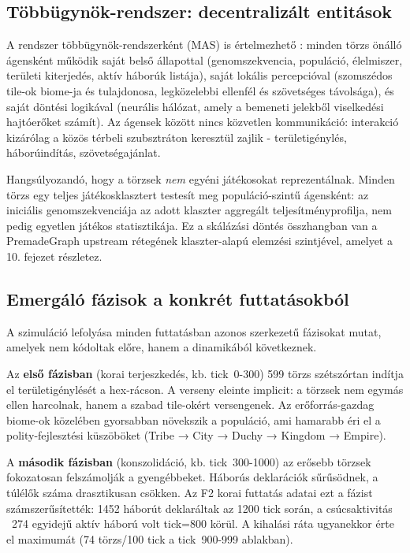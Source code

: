 \subsection*{Többügynök-rendszer: decentralizált entitások}

A rendszer többügynök-rendszerként (MAS) is értelmezhető \cite{wooldridgejennings1995}:
minden törzs önálló ágensként működik saját belső állapottal (genomszekvencia, populáció,
élelmiszer, területi kiterjedés, aktív háborúk listája), saját lokális percepcióval
(szomszédos tile-ok biome-ja és tulajdonosa, legközelebbi ellenfél és szövetséges távolsága),
és saját döntési logikával (neurális hálózat, amely a bemeneti jelekből viselkedési hajtóerőket
számít). Az ágensek között nincs közvetlen kommunikáció: interakció kizárólag a közös
térbeli szubsztráton keresztül zajlik - területigénylés, háborúindítás, szövetségajánlat.

Hangsúlyozandó, hogy a törzsek \textit{nem} egyéni játékosokat reprezentálnak.
Minden törzs egy teljes játékosklasztert testesít meg populáció-szintű ágensként:
az iniciális genomszekvenciája az adott klaszter aggregált teljesítményprofilja,
nem pedig egyetlen játékos statisztikája. Ez a skálázási döntés összhangban van
a PremadeGraph upstream rétegének klaszter-alapú elemzési szintjével,
amelyet a 10. fejezet részletez.

\subsection*{Emergáló fázisok a konkrét futtatásokból}

A szimuláció lefolyása minden futtatásban azonos szerkezetű fázisokat mutat,
amelyek nem kódoltak előre, hanem a dinamikából következnek.

Az \textbf{első fázisban} (korai terjeszkedés, kb. tick~0-300) 599 törzs szétszórtan
indítja el területigénylését a hex-rácson. A verseny eleinte implicit: a törzsek
nem egymás ellen harcolnak, hanem a szabad tile-okért versengenek. Az erőforrás-gazdag
biome-ok közelében gyorsabban növekszik a populáció, ami hamarabb éri el a polity-fejlesztési
küszöböket (Tribe → City → Duchy → Kingdom → Empire).

A \textbf{második fázisban} (konszolidáció, kb. tick~300-1000) az erősebb törzsek
fokozatosan felszámolják a gyengébbeket. Háborús deklarációk sűrűsödnek, a túlélők
száma drasztikusan csökken. Az F2 korai futtatás adatai ezt a fázist számszerűsítették:
1452 háborút deklaráltak az 1200 tick során, a csúcsaktivitás ~274 egyidejű aktív
háború volt tick=800 körül. A kihalási ráta ugyanekkor érte el maximumát
(74 törzs/100 tick a tick~900-999 ablakban).

